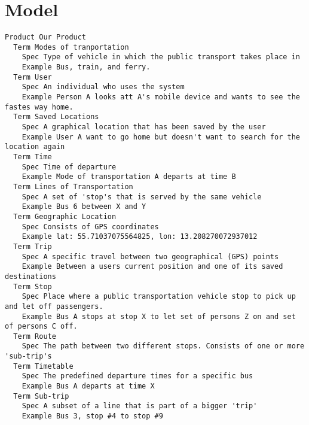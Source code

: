 \chapter{Model}


\begin{lstlisting}
Product Our Product
  Term Modes of tranportation
    Spec Type of vehicle in which the public transport takes place in
    Example Bus, train, and ferry.
  Term User
    Spec An individual who uses the system
    Example Person A looks att A's mobile device and wants to see the fastes way home.
  Term Saved Locations
    Spec A graphical location that has been saved by the user
    Example User A want to go home but doesn't want to search for the location again
  Term Time
    Spec Time of departure
    Example Mode of transportation A departs at time B
  Term Lines of Transportation
    Spec A set of 'stop's that is served by the same vehicle
    Example Bus 6 between X and Y
  Term Geographic Location
    Spec Consists of GPS coordinates
    Example lat: 55.71037075564825, lon: 13.208270072937012
  Term Trip
    Spec A specific travel between two geographical (GPS) points
    Example Between a users current position and one of its saved destinations
  Term Stop
    Spec Place where a public transportation vehicle stop to pick up and let off passengers.
    Example Bus A stops at stop X to let set of persons Z on and set of persons C off.
  Term Route
    Spec The path between two different stops. Consists of one or more 'sub-trip's
  Term Timetable
    Spec The predefined departure times for a specific bus
    Example Bus A departs at time X
  Term Sub-trip
    Spec A subset of a line that is part of a bigger 'trip'
    Example Bus 3, stop #4 to stop #9

\end{lstlisting}